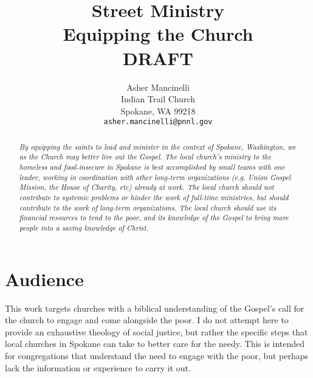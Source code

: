 \documentclass[12pt]{article}
\title{Street Ministry \\
        \large Equipping the Church \\
        \large DRAFT}
\author{Asher Mancinelli \\
        Indian Trail Church \\
        Spokane, WA 99218 \\
        \texttt{asher.mancinelli@pnnl.gov} \\ }
\begin{document}
\maketitle

\begin{abstract}
    \textit{
    By equipping the saints to lead and minister in the context of Spokane, Washington, we as the Church may better live out the Gospel.
    The local church's ministry to the homeless and food-insecure in Spokane is best accomplished by small teams with one leader, working in coordination with other long-term organizations (e.g. Union Gospel Mission, the House of Charity, etc) already at work.
    The local church should not contribute to systemic problems or hinder the work of full-time ministries, but should contribute to the work of long-term organizations.
    The local church should use its financial resources to tend to the poor, and its knowledge of the Gospel to bring more people into a saving knowledge of Christ.
    }
\end{abstract}


\clearpage

\section{Audience}

    This work targets churches with a biblical understanding of the Gospel's call for the church to engage and come alongside the poor.
    I do not attempt here to provide an exhaustive theology of social justice, but rather the specific steps that local churches in Spokane can take to better care for the needy.
    This is intended for congregations that understand the need to engage with the poor, but perhaps lack the information or experience to carry it out.
\end{document}
